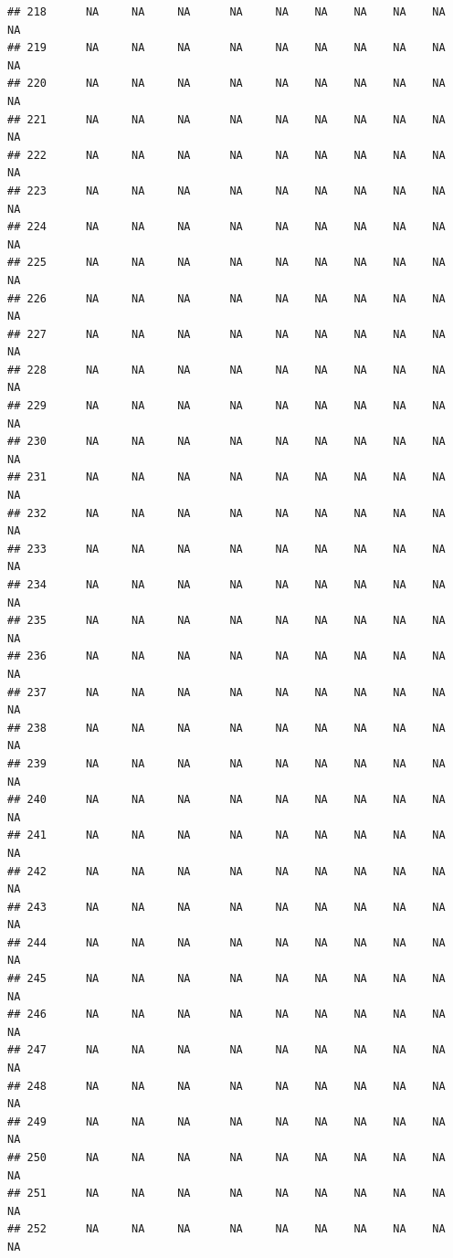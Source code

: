 \documentclass{article}\usepackage{graphicx, color}
\makeatletter
\newenvironment{kframe}{%
 \def\at@end@of@kframe{}%
 \ifinner\ifhmode%
  \def\at@end@of@kframe{\end{minipage}}%
  \begin{minipage}{\columnwidth}%
 \fi\fi%
 \def\FrameCommand##1{\hskip\@totalleftmargin \hskip-\fboxsep
 \colorbox{shadecolor}{##1}\hskip-\fboxsep
     \hskip-\linewidth \hskip-\@totalleftmargin \hskip\columnwidth}%
 \MakeFramed {\advance\hsize-\width
   \@totalleftmargin\z@ \linewidth\hsize
   \@setminipage}}%
 {\par\unskip\endMakeFramed%
 \at@end@of@kframe}
\newenvironment{knitrout}{}{} %
\makeatother
\begin{document}
\begin{knitrout}
\begin{kframe}
\begin{verbatim}
## 218      NA     NA     NA      NA     NA    NA    NA    NA    NA     NA
## 219      NA     NA     NA      NA     NA    NA    NA    NA    NA     NA
## 220      NA     NA     NA      NA     NA    NA    NA    NA    NA     NA
## 221      NA     NA     NA      NA     NA    NA    NA    NA    NA     NA
## 222      NA     NA     NA      NA     NA    NA    NA    NA    NA     NA
## 223      NA     NA     NA      NA     NA    NA    NA    NA    NA     NA
## 224      NA     NA     NA      NA     NA    NA    NA    NA    NA     NA
## 225      NA     NA     NA      NA     NA    NA    NA    NA    NA     NA
## 226      NA     NA     NA      NA     NA    NA    NA    NA    NA     NA
## 227      NA     NA     NA      NA     NA    NA    NA    NA    NA     NA
## 228      NA     NA     NA      NA     NA    NA    NA    NA    NA     NA
## 229      NA     NA     NA      NA     NA    NA    NA    NA    NA     NA
## 230      NA     NA     NA      NA     NA    NA    NA    NA    NA     NA
## 231      NA     NA     NA      NA     NA    NA    NA    NA    NA     NA
## 232      NA     NA     NA      NA     NA    NA    NA    NA    NA     NA
## 233      NA     NA     NA      NA     NA    NA    NA    NA    NA     NA
## 234      NA     NA     NA      NA     NA    NA    NA    NA    NA     NA
## 235      NA     NA     NA      NA     NA    NA    NA    NA    NA     NA
## 236      NA     NA     NA      NA     NA    NA    NA    NA    NA     NA
## 237      NA     NA     NA      NA     NA    NA    NA    NA    NA     NA
## 238      NA     NA     NA      NA     NA    NA    NA    NA    NA     NA
## 239      NA     NA     NA      NA     NA    NA    NA    NA    NA     NA
## 240      NA     NA     NA      NA     NA    NA    NA    NA    NA     NA
## 241      NA     NA     NA      NA     NA    NA    NA    NA    NA     NA
## 242      NA     NA     NA      NA     NA    NA    NA    NA    NA     NA
## 243      NA     NA     NA      NA     NA    NA    NA    NA    NA     NA
## 244      NA     NA     NA      NA     NA    NA    NA    NA    NA     NA
## 245      NA     NA     NA      NA     NA    NA    NA    NA    NA     NA
## 246      NA     NA     NA      NA     NA    NA    NA    NA    NA     NA
## 247      NA     NA     NA      NA     NA    NA    NA    NA    NA     NA
## 248      NA     NA     NA      NA     NA    NA    NA    NA    NA     NA
## 249      NA     NA     NA      NA     NA    NA    NA    NA    NA     NA
## 250      NA     NA     NA      NA     NA    NA    NA    NA    NA     NA
## 251      NA     NA     NA      NA     NA    NA    NA    NA    NA     NA
## 252      NA     NA     NA      NA     NA    NA    NA    NA    NA     NA

\end{verbatim}
\end{kframe}
\end{knitrout}
\end{document}
